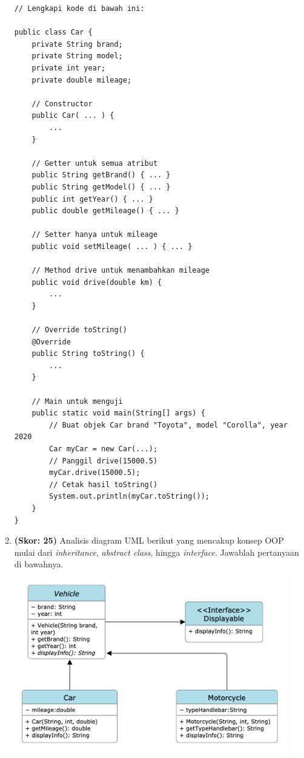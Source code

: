 \documentclass[10pt,openany,a4paper]{article}
\begin{document}
\begin{enumerate}
    \begin{verbatim}
// Lengkapi kode di bawah ini:

public class Car {
    private String brand;
    private String model;
    private int year;
    private double mileage;

    // Constructor
    public Car( ... ) {
        ...
    }

    // Getter untuk semua atribut
    public String getBrand() { ... }
    public String getModel() { ... }
    public int getYear() { ... }
    public double getMileage() { ... }

    // Setter hanya untuk mileage
    public void setMileage( ... ) { ... }

    // Method drive untuk menambahkan mileage
    public void drive(double km) {
        ...
    }

    // Override toString()
    @Override
    public String toString() {
        ...
    }

    // Main untuk menguji
    public static void main(String[] args) {
        // Buat objek Car brand "Toyota", model "Corolla", year 2020
        Car myCar = new Car(...);
        // Panggil drive(15000.5)
        myCar.drive(15000.5);
        // Cetak hasil toString()
        System.out.println(myCar.toString());
    }
}
    \end{verbatim}

    \item \textbf{(Skor: 25)}  
    Analisis diagram UML berikut yang mencakup konsep OOP mulai dari \textit{inheritance}, \textit{abstract class}, hingga \textit{interface}. Jawablah pertanyaan di bawahnya.\vspace{2mm}


    \includegraphics[width=12cm]{soal4.png}



\end{enumerate}
\end{document}
